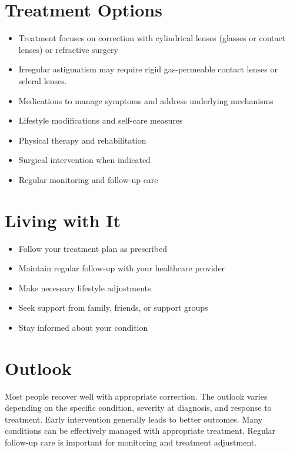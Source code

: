 \section{Treatment Options}
\begin{itemize}[noitemsep]
  \item Treatment focuses on correction with cylindrical lenses (glasses or contact lenses) or refractive surgery
  \item Irregular astigmatism may require rigid gas-permeable contact lenses or scleral lenses.
  \item Medications to manage symptoms and address underlying mechanisms
  \item Lifestyle modifications and self-care measures
  \item Physical therapy and rehabilitation
  \item Surgical intervention when indicated
  \item Regular monitoring and follow-up care
\end{itemize}
\section{Living with It}
\begin{itemize}[noitemsep]
  \item Follow your treatment plan as prescribed
  \item Maintain regular follow-up with your healthcare provider
  \item Make necessary lifestyle adjustments
  \item Seek support from family, friends, or support groups
  \item Stay informed about your condition
\end{itemize}
\section{Outlook}
Most people recover well with appropriate correction. The outlook varies depending on the specific condition, severity at diagnosis, and response to treatment. Early intervention generally leads to better outcomes. Many conditions can be effectively managed with appropriate treatment. Regular follow-up care is important for monitoring and treatment adjustment.
